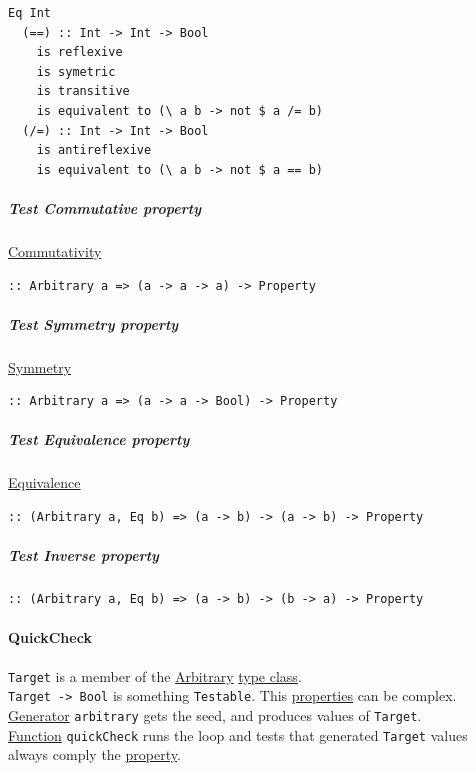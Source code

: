 \documentclass[11pt]{article}
\begin{document}
\begin{verbatim}
Eq Int
  (==) :: Int -> Int -> Bool
    is reflexive
    is symetric
    is transitive
    is equivalent to (\ a b -> not $ a /= b)
  (/=) :: Int -> Int -> Bool
    is antireflexive
    is equivalent to (\ a b -> not $ a == b)
\end{verbatim}

\subparagraph{\label{org1a944b6}Test Commutative property}
\label{sec:orgdb6fafe}
\hyperref[org78de62b]{Commutativity}\\
\begin{verbatim}
:: Arbitrary a => (a -> a -> a) -> Property
\end{verbatim}

\subparagraph{\label{org896010f}Test Symmetry property}
\label{sec:org8630954}
\hyperref[orgfb5b0f8]{Symmetry}\\
\begin{verbatim}
:: Arbitrary a => (a -> a -> Bool) -> Property
\end{verbatim}

\subparagraph{\label{orgadd92be}Test Equivalence property}
\label{sec:org49927c8}
\hyperref[orgbc0d2cd]{Equivalence}\\
\begin{verbatim}
:: (Arbitrary a, Eq b) => (a -> b) -> (a -> b) -> Property
\end{verbatim}

\subparagraph{\label{org043929c}Test Inverse property}
\label{sec:org1e69771}
\begin{verbatim}
:: (Arbitrary a, Eq b) => (a -> b) -> (b -> a) -> Property
\end{verbatim}

\paragraph{\label{org1fdb89a}QuickCheck}
\label{sec:org93c789c}
\texttt{Target} is a member of the \hyperref[orga23d095]{Arbitrary} \hyperref[org16d8a26]{type class}.\\
\texttt{Target -> Bool} is something \texttt{Testable}. This \hyperref[org85fb3a1]{properties} can be complex.\\
\hyperref[org1fe413f]{Generator} \texttt{arbitrary} gets the seed, and produces values of \texttt{Target}.\\
\hyperref[orge15bc14]{Function} \texttt{quickCheck} runs the loop and tests that generated \texttt{Target} values always comply the \hyperref[orgf8c3cc7]{property}.\\
\end{document}
